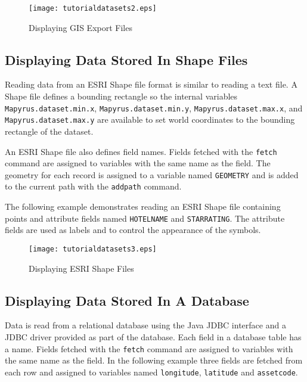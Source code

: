 

\begin{figure}[h]
\texttt{[image: tutorialdatasets2.eps]}
\caption{Displaying GIS Export Files}
\label{tutorialdatasets2}
\end{figure}

\subsection{Displaying Data Stored In Shape Files}

Reading data from an ESRI Shape file format is similar to reading a text file.
A Shape file defines a bounding rectangle so the internal variables
\texttt{Mapyrus.dataset.min.x}, \texttt{Mapyrus.dataset.min.y},
\texttt{Mapyrus.dataset.max.x}, and \texttt{Mapyrus.dataset.max.y} are
available to set world coordinates to the bounding rectangle of the dataset.

An ESRI Shape file also defines field names.  Fields fetched with the
\texttt{fetch} command are assigned to variables with the same name as the
field.  The geometry for each record is assigned to a variable named
\texttt{GEOMETRY} and is added to the current path with the \texttt{addpath}
command.

The following example demonstrates reading an ESRI Shape file containing points
and attribute fields named \texttt{HOTELNAME} and \texttt{STARRATING}.  The
attribute fields are used as labels and to control the appearance of the
symbols.



\begin{figure}[h]
\texttt{[image: tutorialdatasets3.eps]}
\caption{Displaying ESRI Shape Files}
\label{tutorialdatasets3}
\end{figure}

\subsection{Displaying Data Stored In A Database}

Data is read from a relational database using
the Java JDBC interface and a JDBC driver provided
as part of the database.
Each field in a database table has a name.
Fields fetched with the
\texttt{fetch}
command are assigned to variables with the same name as the field.
In the following example three fields are fetched from each
row and assigned to variables named
\texttt{longitude}, \texttt{latitude} and \texttt{assetcode}.

